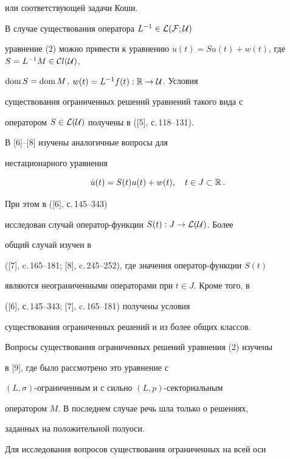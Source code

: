 или соответствующей задачи Коши.





В случае существования оператора $L^{-1}\in\cal L(\cal F;\cal U)$


уравнение (2) можно привести к уравнению $\Dot


u(t)=Su(t)+w(t)$, где $S=L^{-1}M\in{\cal C}l(\cal U)$,


$\operatorname{dom} S=\operatorname{dom} M$, $w(t)=L^{-1}f(t):{\Bbb R}\to {\cal U}$. Условия


существования ограниченных решений уравнений такого вида с


оператором $S\in\cal L(\cal U)$ получены в ([5], с.\,118--131).





В [6]--[8] изучены аналогичные вопросы для


нестационарного уравнения


$$


\Dot u(t)=S(t)u(t)+w(t),\quad t\in J\subset \Bbb R\,.


$$


При этом в ([6], с.\,145--343)


исследован случай оператор-функции $S(t):J\to\cal L(\cal U)$. Более


общий случай изучен в


([7], c.\,165--181; [8], c.\,245--252), где значения оператор-функции $S(t)$


являются неограниченными операторами при $t\in J$. Кроме того, в


([6], с.\,145--343; [7], c.\,165--181) получены условия


существования ограниченных решений и из более общих классов.





Вопросы существования ограниченных решений уравнения (2) изучены


в [9], где было рассмотрено это уравнение с


$(L,\sigma)$-ограниченным и с сильно $(L,p)$-сек\-то\-ри\-аль\-ным


оператором $M$. В последнем случае речь шла только о решениях,


заданных на положительной полуоси.





Для исследования вопросов существования ограниченных на всей оси


